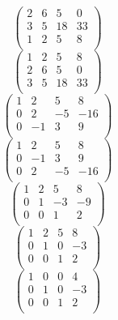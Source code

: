\documentclass{fkssolpub}
\begin{document}
\[
	\left(
	\begin{array}{ccc|c}
			2 & 6 & 5  & 0  \\
			3 & 5 & 18 & 33 \\
			1 & 2 & 5  & 8  \\
		\end{array}
	\right)
\]
\[
	\left(
	\begin{array}{ccc|c}
			1 & 2 & 5  & 8  \\
			2 & 6 & 5  & 0  \\
			3 & 5 & 18 & 33 \\
		\end{array}
	\right)
\]
\[
	\left(
	\begin{array}{ccc|c}
			1 & 2  & 5  & 8   \\
			0 & 2  & -5 & -16 \\
			0 & -1 & 3  & 9   \\
		\end{array}
	\right)
\]
\[
	\left(
	\begin{array}{ccc|c}
			1 & 2  & 5  & 8   \\
			0 & -1 & 3  & 9   \\
			0 & 2  & -5 & -16 \\
		\end{array}
	\right)
\]
\[
	\left(
	\begin{array}{ccc|c}
			1 & 2 & 5  & 8  \\
			0 & 1 & -3 & -9 \\
			0 & 0 & 1  & 2  \\
		\end{array}
	\right)
\]
\[
	\left(
	\begin{array}{ccc|c}
			1 & 2 & 5 & 8  \\
			0 & 1 & 0 & -3 \\
			0 & 0 & 1 & 2  \\
		\end{array}
	\right)
\]
\[
	\left(
	\begin{array}{ccc|c}
			1 & 0 & 0 & 4  \\
			0 & 1 & 0 & -3 \\
			0 & 0 & 1 & 2  \\
		\end{array}
	\right)
\]
\end{document}
